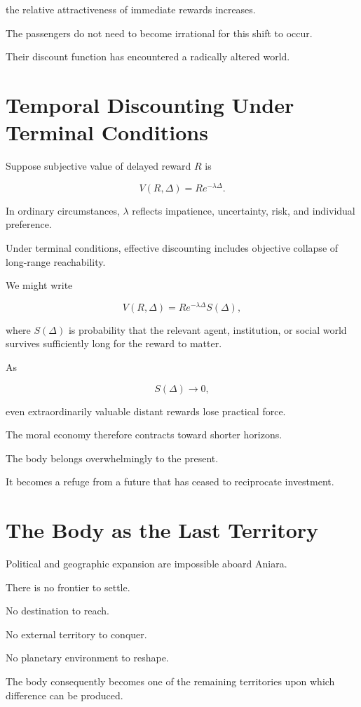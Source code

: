 \documentclass[11pt,oneside]{book}
\theoremstyle{definition}
\theoremstyle{remark}
\begin{document}
the relative attractiveness of immediate rewards increases.

The passengers do not need to become irrational for this shift to occur.

Their discount function has encountered a radically altered world.

\section{Temporal Discounting Under Terminal Conditions}

Suppose subjective value of delayed reward \(R\) is

\[
V(R,\Delta)
=
R e^{-\lambda\Delta}.
\]

In ordinary circumstances, \(\lambda\) reflects impatience, uncertainty, risk, and individual preference.

Under terminal conditions, effective discounting includes objective collapse of long-range reachability.

We might write

\[
V(R,\Delta)
=
R e^{-\lambda\Delta}S(\Delta),
\]

where \(S(\Delta)\) is probability that the relevant agent, institution, or social world survives sufficiently long for the reward to matter.

As

\[
S(\Delta)\rightarrow0,
\]

even extraordinarily valuable distant rewards lose practical force.

The moral economy therefore contracts toward shorter horizons.

The body belongs overwhelmingly to the present.

It becomes a refuge from a future that has ceased to reciprocate investment.

\section{The Body as the Last Territory}

Political and geographic expansion are impossible aboard Aniara.

There is no frontier to settle.

No destination to reach.

No external territory to conquer.

No planetary environment to reshape.

The body consequently becomes one of the remaining territories upon which difference can be produced.
\end{document}

